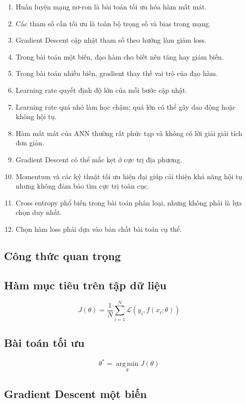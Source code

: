 \begin{enumerate}
    \item Huấn luyện mạng nơ-ron là bài toán tối ưu hóa hàm mất mát.
    \item Các tham số cần tối ưu là toàn bộ trọng số và bias trong mạng.
    \item Gradient Descent cập nhật tham số theo hướng làm giảm loss.
    \item Trong bài toán một biến, đạo hàm cho biết nên tăng hay giảm biến.
    \item Trong bài toán nhiều biến, gradient thay thế vai trò của đạo hàm.
    \item Learning rate quyết định độ lớn của mỗi bước cập nhật.
    \item Learning rate quá nhỏ làm học chậm; quá lớn có thể gây dao động hoặc không hội tụ.
    \item Hàm mất mát của ANN thường rất phức tạp và không có lời giải giải tích đơn giản.
    \item Gradient Descent có thể mắc kẹt ở cực trị địa phương.
    \item Momentum và các kỹ thuật tối ưu hiện đại giúp cải thiện khả năng hội tụ nhưng không đảm bảo tìm cực trị toàn cục.
    \item Cross entropy phổ biến trong bài toán phân loại, nhưng không phải là lựa chọn duy nhất.
    \item Chọn hàm loss phải dựa vào bản chất bài toán cụ thể.
\end{enumerate}

\subsection{Công thức quan trọng}

\subsection*{Hàm mục tiêu trên tập dữ liệu}

\[
    J(\theta)
    =
    \frac{1}{N}
    \sum_{i=1}^{N}
    \mathcal{L}
    \left(
    y_i,
    f(x_i;\theta)
    \right)
\]

\subsection*{Bài toán tối ưu}

\[
    \theta^*
    =
    \operatorname*{arg\,min}_{\theta}J(\theta)
\]

\subsection*{Gradient Descent một biến}

